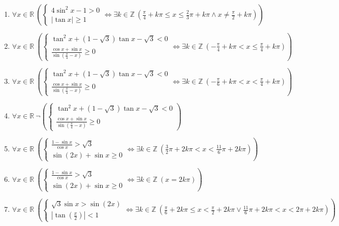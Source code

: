 \documentclass[11pt,a4paper]{article}
\begin{document}
\begin{enumerate}
\item $\displaystyle \forall x \in \mathbb{R}\ \left( \begin{cases} 4\sin^{2} x - 1 > 0 \\ \left|\tan x\right| \ge 1 \end{cases} \iff \exists k \in \mathbb{Z}\ \left( \frac{\pi}{4} + k\pi \le x \le \frac{2}{3}\pi + k\pi \land x \neq \frac{\pi}{2} + k\pi \right) \right)$
\item $\displaystyle \forall x \in \mathbb{R}\ \left( \begin{cases} \tan^{2} x + (1 - \sqrt{3})\tan x - \sqrt{3} < 0 \\ \frac{\cos x + \sin x}{\sin\left(\frac{\pi}{4} - x\right)} \ge 0 \end{cases} \iff \exists k \in \mathbb{Z}\ \left( -\frac{\pi}{4} + k\pi < x \le \frac{\pi}{4} + k\pi \right) \right)$
\item $\displaystyle \forall x \in \mathbb{R}\ \left( \begin{cases} \tan^{2} x + (1 - \sqrt{3})\tan x - \sqrt{3} < 0 \\ \frac{\cos x + \sin x}{\sin\left(\frac{\pi}{4} - x\right)} \ge 0 \end{cases} \iff \exists k \in \mathbb{Z}\ \left( -\frac{\pi}{6} + k\pi < x < \frac{\pi}{4} + k\pi \right) \right)$
\item $\displaystyle \forall x \in \mathbb{R}\ \lnot \left( \begin{cases} \tan^{2} x + (1 - \sqrt{3})\tan x - \sqrt{3} < 0 \\ \frac{\cos x + \sin x}{\sin\left(\frac{\pi}{4} - x\right)} \ge 0 \end{cases} \right)$
\item $\displaystyle \forall x \in \mathbb{R}\ \left( \begin{cases} \frac{1 - \sin x}{\cos x} > \sqrt{3} \\ \sin\left(2x\right) + \sin x \ge 0 \end{cases} \iff \exists k \in \mathbb{Z}\ \left( \frac{3}{2}\pi + 2k\pi < x < \frac{11}{6}\pi + 2k\pi \right) \right)$
\item $\displaystyle \forall x \in \mathbb{R}\ \left( \begin{cases} \frac{1 - \sin x}{\cos x} > \sqrt{3} \\ \sin\left(2x\right) + \sin x \ge 0 \end{cases} \iff \exists k \in \mathbb{Z}\ \left( x = 2k\pi \right) \right)$
\item $\displaystyle \forall x \in \mathbb{R}\ \left( \begin{cases} \sqrt{3}\sin x > \sin\left(2x\right) \\ \left|\tan\left(\frac{x}{2}\right)\right| < 1 \end{cases} \iff \exists k \in \mathbb{Z}\ \left( \frac{\pi}{6} + 2k\pi \le x < \frac{\pi}{2} + 2k\pi \lor \frac{11}{6}\pi + 2k\pi < x < 2\pi + 2k\pi \right) \right)$

\end{enumerate}
\end{document}
